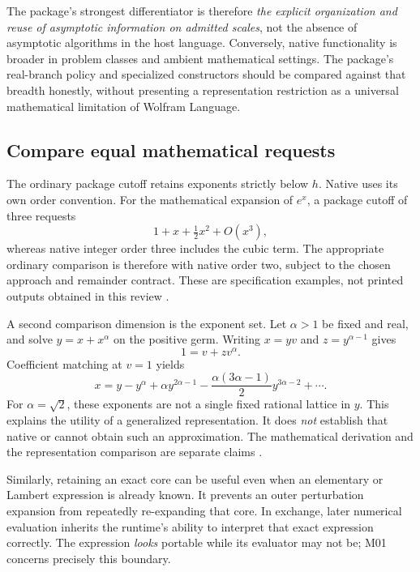 \documentclass[11pt,a4paper]{article}
\newcommand{\code}[1]{\texttt{\detokenize{#1}}}
\theoremstyle{remark}
\begin{document}
The package's strongest differentiator is therefore \emph{the explicit organization and reuse of asymptotic information on admitted scales}, not the absence of asymptotic algorithms in the host language. Conversely, native functionality is broader in problem classes and ambient mathematical settings. The package's real-branch policy and specialized constructors should be compared against that breadth honestly, without presenting a representation restriction as a universal mathematical limitation of Wolfram Language.

\subsection{Compare equal mathematical requests}

The ordinary package cutoff retains exponents strictly below $h$. Native \code{Series} uses its own order convention. For the mathematical expansion of $e^x$, a package cutoff of three requests
\[
 1+x+\tfrac12x^2+O(x^3),
\]
whereas native integer order three includes the cubic term. The appropriate ordinary comparison is therefore with native order two, subject to the chosen approach and remainder contract. These are specification examples, not printed outputs obtained in this review \cite{core,wlseries}.

A second comparison dimension is the exponent set. Let $\alpha>1$ be fixed and real, and solve $y=x+x^\alpha$ on the positive germ. Writing $x=yv$ and $z=y^{\alpha-1}$ gives
\[
 1=v+zv^\alpha.
\]
Coefficient matching at $v=1$ yields
\begin{equation}\label{eq:irrational}
 x=y-y^\alpha+\alpha y^{2\alpha-1}
 -\frac{\alpha(3\alpha-1)}2y^{3\alpha-2}+\cdots.
\end{equation}
For $\alpha=\sqrt2$, these exponents are not a single fixed rational \code{SeriesData} lattice in $y$. This explains the utility of a generalized representation. It does \emph{not} establish that native \code{Asymptotic} or \code{AsymptoticSolve} cannot obtain such an approximation. The mathematical derivation and the representation comparison are separate claims \cite{wlseriesdata,wlasymptoticsolve}.

Similarly, retaining an exact core can be useful even when an elementary or Lambert expression is already known. It prevents an outer perturbation expansion from repeatedly re-expanding that core. In exchange, later numerical evaluation inherits the runtime's ability to interpret that exact expression correctly. The expression \emph{looks} portable while its evaluator may not be; M01 concerns precisely this boundary.
\end{document}
